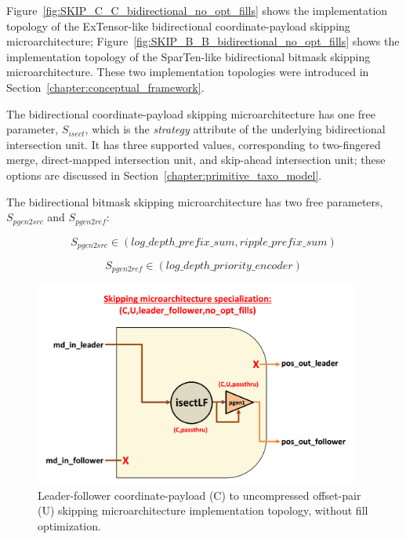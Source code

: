 Figure~\ref{fig:SKIP_C_C_bidirectional_no_opt_fills} shows the implementation topology of the ExTensor-like\cite{extensor} bidirectional coordinate-payload skipping microarchitecture; Figure~\ref{fig:SKIP_B_B_bidirectional_no_opt_fills} shows the implementation topology of the SparTen-like\cite{sparten} bidirectional bitmask skipping microarchitecture. These two implementation topologies were introduced in Section~\ref{chapter:conceptual_framework}.

The bidirectional coordinate-payload skipping microarchitecture has one free parameter, $S_{isect}$, which is the \textit{strategy} attribute of the underlying bidirectional intersection unit. It has three supported values, corresponding to two-fingered merge, direct-mapped intersection unit, and skip-ahead intersection unit; these options are discussed in Section~\ref{chapter:primitive_taxo_model}.

The bidirectional bitmask skipping microarchitecture has two free parameters, $S_{pgen2src}$ and $S_{pgen2ref}$:

\[ S_{pgen2src} \in (log\_depth\_prefix\_sum , ripple\_prefix\_sum) \]

\[ S_{pgen2ref} \in (log\_depth\_priority\_encoder) \]

\begin{figure}[H]
    \centering
    \includegraphics[width=0.95\textwidth]{figures/SKIP_C_U_leader_follower_no_opt_fills.png}
    \caption{Leader-follower coordinate-payload (C) to uncompressed offset-pair (U) skipping microarchitecture implementation topology, without fill optimization.}
    \label{fig:SKIP_C_U_leader_follower_no_opt_fills}
\end{figure}

